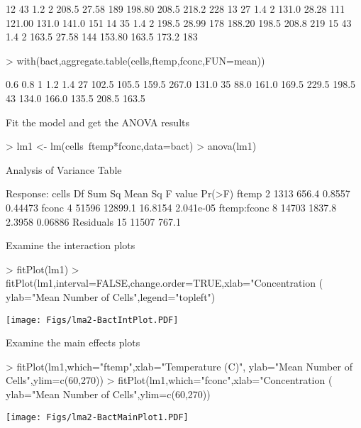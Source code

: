\documentclass{article}
\begin{document}
\begin{Schunk}
\begin{Soutput}
12    43   1.2 2 208.5    27.58  189  198.80  208.5   218.2  228
13    27   1.4 2 131.0    28.28  111  121.00  131.0   141.0  151
14    35   1.4 2 198.5    28.99  178  188.20  198.5   208.8  219
15    43   1.4 2 163.5    27.58  144  153.80  163.5   173.2  183
\end{Soutput}
\begin{Sinput}
> with(bact,aggregate.table(cells,ftemp,fconc,FUN=mean))
\end{Sinput}
\begin{Soutput}
     0.6   0.8     1   1.2   1.4
27 102.5 105.5 159.5 267.0 131.0
35  88.0 161.0 169.5 229.5 198.5
43 134.0 166.0 135.5 208.5 163.5
\end{Soutput}
\end{Schunk}

Fit the model and get the ANOVA results
\begin{Schunk}
\begin{Sinput}
> lm1 <- lm(cells~ftemp*fconc,data=bact)
> anova(lm1)
\end{Sinput}
\begin{Soutput}
Analysis of Variance Table

Response: cells
            Df Sum Sq Mean Sq F value    Pr(>F)
ftemp        2   1313   656.4  0.8557   0.44473
fconc        4  51596 12899.1 16.8154 2.041e-05
ftemp:fconc  8  14703  1837.8  2.3958   0.06886
Residuals   15  11507   767.1                  
\end{Soutput}
\end{Schunk}


Examine the interaction plots

\begin{Schunk}
\begin{Sinput}
> fitPlot(lm1)
> fitPlot(lm1,interval=FALSE,change.order=TRUE,xlab="Concentration (%)",
  ylab="Mean Number of Cells",legend="topleft")
\end{Sinput}
\end{Schunk}
\texttt{[image: Figs/lma2-BactIntPlot.PDF]}

Examine the main effects plots
\begin{Schunk}
\begin{Sinput}
> fitPlot(lm1,which="ftemp",xlab="Temperature (C)",
  ylab="Mean Number of Cells",ylim=c(60,270))
> fitPlot(lm1,which="fconc",xlab="Concentration (%)",
  ylab="Mean Number of Cells",ylim=c(60,270))
\end{Sinput}
\end{Schunk}
\texttt{[image: Figs/lma2-BactMainPlot1.PDF]}
\end{document}
